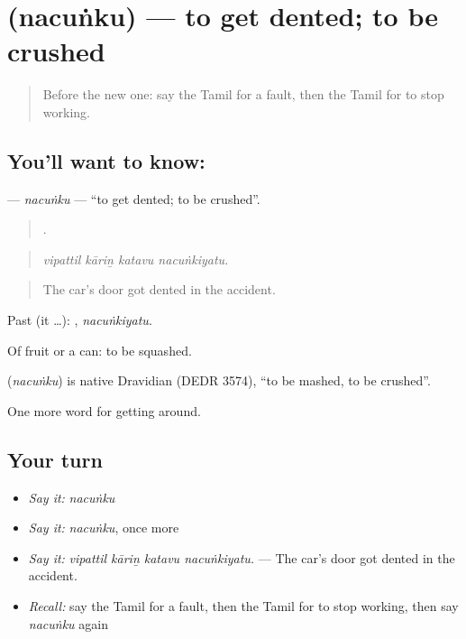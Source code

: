 \section[\texorpdfstring{\ta{நசுங்கு} (nacuṅku)}{நசுங்கு (nacuṅku)}]{ (nacuṅku) — to get dented; to be crushed}

\label{lesson:TA-C411-nacunku}



\begin{quote}
Before the new one: say the Tamil for a fault, then the Tamil for to stop working.
\end{quote}

\subsection*{You'll want to know: }
\textbf{} — \emph{nacuṅku} — \textquotedblleft{}to get dented; to be crushed\textquotedblright{}.

\begin{quote}
   .
\end{quote}

\begin{quote}
\emph{vipattil kāriṉ katavu nacuṅkiyatu.}
\end{quote}

\begin{quote}
The car's door got dented in the accident.
\end{quote}

Past (it …): , \emph{nacuṅkiyatu}.

Of fruit or a can: to be squashed.

\begin{cousinweb}
\textbf{} (\emph{nacuṅku}) is native Dravidian (DEDR 3574), \textquotedblleft{}to be mashed, to be crushed\textquotedblright{}.
\end{cousinweb}

\begin{grammarlens}[title={What you've built}]
One more word for getting around.
\end{grammarlens}

\subsection*{Your turn}
\begin{itemize}
\raggedright
  \item \emph{Say it:} \emph{nacuṅku}
  \item \emph{Say it:} \emph{nacuṅku}, once more
  \item \emph{Say it:} \emph{vipattil kāriṉ katavu nacuṅkiyatu.} — The car's door got dented in the accident.
  \item \emph{Recall:} say the Tamil for a fault, then the Tamil for to stop working, then say \emph{nacuṅku} again
\end{itemize}

